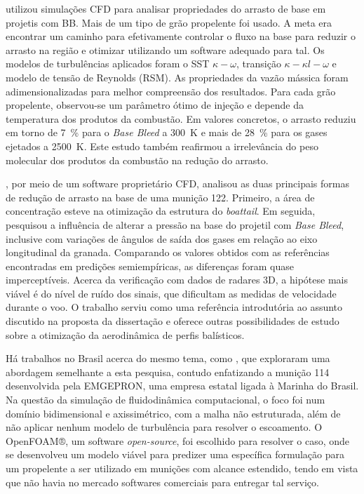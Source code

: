 \citeauthor{Dali2018a} utilizou simulações CFD para analisar propriedades do arrasto de base em projetis com BB. Mais de um tipo de grão propelente foi usado. A meta era encontrar um caminho para efetivamente controlar o fluxo na base para reduzir o arrasto na região e otimizar utilizando um software adequado para tal. Os modelos de turbulências aplicados foram o SST \(\kappa-\omega\), transição \(\kappa-\kappa l-\omega\) e modelo de tensão de Reynolds (RSM). As propriedades da vazão mássica foram adimensionalizadas para melhor compreensão dos resultados. Para cada grão propelente, observou-se um parâmetro ótimo de injeção e depende da temperatura dos produtos da combustão. Em valores concretos, o arrasto reduziu em torno de \qty{7}{\percent} para o \textit{Base Bleed} a \qty{300}{\kelvin} e mais de \qty{28}{\percent} para os gases ejetados a \qty{2500}{\kelvin}. Este estudo também reafirmou a irrelevância do peso molecular dos produtos da combustão na redução do arrasto.
	
\citeauthor{Dali2018b}, por meio de um software proprietário CFD, analisou as duas principais formas de redução de arrasto na base de uma munição \qty{122}{\millimetre}. Primeiro, a área de concentração esteve na otimização da estrutura do \textit{boattail}. Em seguida, pesquisou a influência de alterar a pressão na base do projetil com \textit{Base Bleed}, inclusive com variações de ângulos de saída dos gases em relação ao eixo longitudinal da granada. Comparando os valores obtidos com as referências encontradas em predições semiempíricas, as diferenças foram quase imperceptíveis. Acerca da verificação com dados de radares 3D, a hipótese mais viável é do nível de ruído dos sinais, que dificultam as medidas de velocidade durante o voo. O trabalho serviu como uma referência introdutória ao assunto discutido na proposta da dissertação e oferece outras possibilidades de estudo sobre a otimização da aerodinâmica de perfis balísticos. 
	
Há trabalhos no Brasil acerca do mesmo tema, como \cite{Lucena2020,Rosendo2020,Gil2020}, que exploraram uma abordagem semelhante a esta pesquisa, contudo enfatizando a munição \qty{114}{\millimetre} desenvolvida pela EMGEPRON, uma empresa estatal ligada à Marinha do Brasil. Na questão da simulação de fluidodinâmica computacional, o foco foi num domínio bidimensional e axissimétrico, com a malha não estruturada, além de não aplicar nenhum modelo de turbulência para resolver o escoamento. O OpenFOAM®, um software \textit{open-source}, foi escolhido para resolver o caso, onde se desenvolveu um modelo viável para predizer uma específica formulação para um propelente a ser utilizado em munições com alcance estendido, tendo em vista que não havia no mercado softwares comerciais para entregar tal serviço. 


